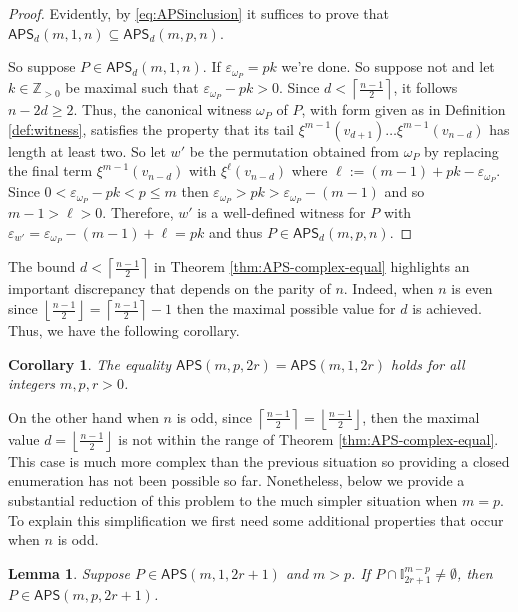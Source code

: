 \documentclass[12pt,reqno]{amsart}
\numberwithin{equation}{section}
\theoremstyle{plain}
\newtheorem{lemma}[theorem]{Lemma}
\newtheorem{corollary}[theorem]{Corollary}
\theoremstyle{definition}
\theoremstyle{remark}
\newcommand{\Z}{\mathbb{Z}}
\newcommand{\I}{\mathbb{I}}
\newcommand\APS{\mathsf{APS}}
\newcommand{\ceil}[1]{\left\lceil#1\right\rceil}
\newcommand{\floor}[1]{\left\lfloor#1\right\rfloor}
\begin{document}
\begin{proof}
    Evidently, by \eqref{eq:APSinclusion} it suffices to prove that $\APS_d(m, 1, n) \subseteq \APS_d(m, p, n)$.

 So suppose $P \in \APS_d(m,1,n)$. If $\varepsilon_{\omega_P}=pk$ we're done. So suppose not and let $k\in \Z_{>0}$ be maximal such that $\varepsilon_{\omega_P} - pk> 0$. Since $d  < \ceil{\frac{n-1}{2}}$, it follows $n-2d\geq 2$. Thus, the canonical witness $\omega_P$ of $P$, with form given as in Definition \ref{def:witness}, satisfies the property that its tail $\xi^{m-1}(v_{d+1}) \dots \xi^{m-1}(v_{n-d})$ has length at least two. So let $w'$ be the permutation obtained from $\omega_P$ by replacing the final term $\xi^{m-1}(v_{n-d})$ with $\xi^{\ell}(v_{n-d})$ where $\ell:=(m-1)+pk -\varepsilon_{\omega_P}$. Since $0 < \varepsilon_{\omega_P}-pk < p \leq m$ then $ \varepsilon_{\omega_P} > pk >\varepsilon_{\omega_P}- (m-1)$ and so $m-1>\ell>0$.
Therefore, $w'$ is a well-defined witness for $P$ with 
$ \varepsilon_{w'} = \varepsilon_{\omega_P} - (m-1)+\ell= pk
$
and thus $P \in \APS_d(m,p,n)$.
\end{proof}

The bound $d  < \ceil{\frac{n-1}{2}}$ in Theorem \ref{thm:APS-complex-equal} highlights an important discrepancy that depends on the parity of $n$. Indeed, when $n$ is even since $\floor{\frac{n-1}{2}}=\ceil{\frac{n-1}{2}}-1$ then the maximal possible value for $d$ is achieved. Thus, we have the following corollary. 

\begin{corollary}\label{cor:APS-even}
    The equality 
   $\APS(m,p,2r)=\APS(m,1,2r)$ holds for all integers $m,p,r>0$.
\end{corollary}

On the other hand when $n$ is odd, since $ \ceil{\frac{n-1}{2}} = \floor{\frac{n-1}{2}}$, then the maximal value $d= \floor{\frac{n-1}{2}}$ is not within the range of Theorem \ref{thm:APS-complex-equal}. This case is much more complex than the previous situation so providing a closed enumeration has not been possible so far. Nonetheless, below we provide a substantial reduction of this problem to the much simpler situation when $m=p$. To explain this simplification we first need some additional properties that occur when $n$ is odd. 


\begin{lemma} \label{lem:APScomplement}
    Suppose $P \in \APS(m,1,2r+1)$ and $m>p$. If $P \cap \I^{m-p}_{2r+1} \neq \emptyset$, then $P \in \APS(m,p,2r+1)$. 
\end{lemma}
\end{document}
